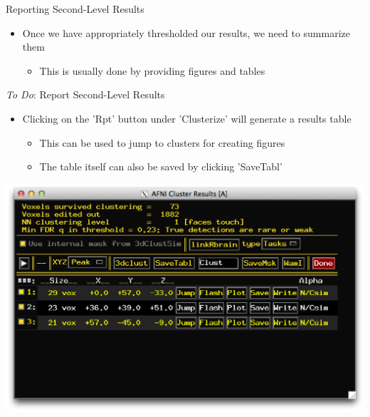 \documentclass[t,12pt]{beamer}
\begin{document}
\begin{frame}{Reporting Second-Level Results}
\vspace{10pt}
\begin{itemize}
\setlength\itemsep{1em}
\item Once we have appropriately thresholded our results, we need to summarize them
\vspace{4pt}
\begin{itemize}
\item This is usually done by providing figures and tables
\end{itemize}
\end{itemize}
\end{frame}

\begin{frame}{\emph{To Do}: Report Second-Level Results}
\vspace{10pt}
\begin{itemize}
\setlength\itemsep{1em}
\item Clicking on the 'Rpt' button under 'Clusterize' will generate a results table
\vspace{4pt}
\begin{itemize}
\setlength\itemsep{0.5em}
\item This can be used to jump to clusters for creating figures
\item The table itself can also be saved by clicking 'SaveTabl'
\end{itemize}
\end{itemize}
\centering
\includegraphics[width=.5\textwidth]{images/clust_rpt.png}
\end{frame}
\end{document}
